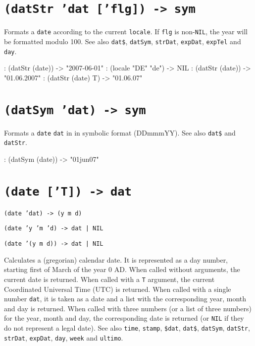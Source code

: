  
\section*{\texttt{(datStr 'dat ['flg]) -> sym}}
\label{sec:func-ref-D-(datStr 'dat ['flg]) -> sym}


Formats a \texttt{date} according to the current \texttt{locale}. If \texttt{flg} is
non-\texttt{NIL}, the year will be formatted modulo 100. See also \texttt{dat\$},
\texttt{datSym}, \texttt{strDat}, \texttt{expDat}, \texttt{expTel} and \texttt{day}.


\begin{wideverbatim}
: (datStr (date))
-> "2007-06-01"
: (locale "DE" "de")
-> NIL
: (datStr (date))
-> "01.06.2007"
: (datStr (date) T)
-> "01.06.07"
\end{wideverbatim}

 
\section*{\texttt{(datSym 'dat) -> sym}}
\label{sec:func-ref-D-(datSym 'dat) -> sym}


Formats a \texttt{date} \texttt{dat} in in symbolic format (DDmmmYY). See also \texttt{dat\$}
and \texttt{datStr}.


\begin{wideverbatim}
: (datSym (date))
-> "01jun07"
\end{wideverbatim}

 
\section*{\texttt{(date ['T]) -> dat}}
\label{sec:func-ref-D-(date ['T]) -> dat}


\texttt{(date 'dat) -> (y m d)}

\texttt{(date 'y 'm 'd) -> dat | NIL}

\texttt{(date '(y m d)) -> dat | NIL}

Calculates a (gregorian) calendar date. It is represented as a day
number, starting first of March of the year 0 AD. When called without
arguments, the current date is returned. When called with a \texttt{T}
argument, the current Coordinated Universal Time (UTC) is returned. When
called with a single number \texttt{dat}, it is taken as a date and a list with
the corresponding year, month and day is returned. When called with
three numbers (or a list of three numbers) for the year, month and day,
the corresponding date is returned (or \texttt{NIL} if they do not represent a
legal date). See also \texttt{time}, \texttt{stamp}, \texttt{\$dat}, \texttt{dat\$}, \texttt{datSym},
\texttt{datStr}, \texttt{strDat}, \texttt{expDat}, \texttt{day}, \texttt{week} and \texttt{ultimo}.


